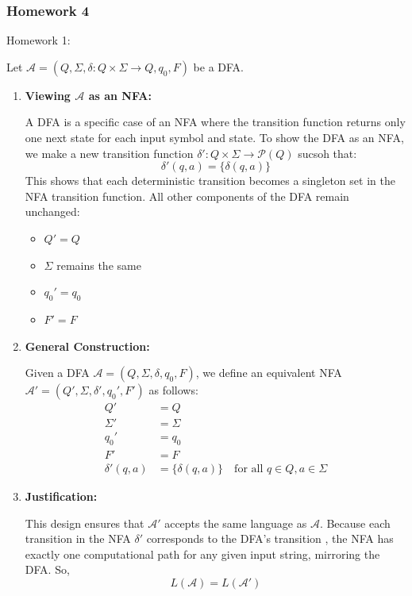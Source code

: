 \documentclass{article}
\theoremstyle{theorem}
\theoremstyle{definition}
\theoremstyle{remark}
\begin{document}
\subsubsection*{Homework 4}

Homework 1:

Let $\mathcal{A} = (Q, \Sigma, \delta: Q \times \Sigma \to Q, q_0, F)$ be a DFA.

\begin{enumerate}
    \item \textbf{Viewing $\mathcal{A}$ as an NFA:}

    A DFA is a specific case of an NFA where the transition function returns only one next state for each input symbol and state. To show the DFA as an NFA, we make a new transition function $\delta': Q \times \Sigma \to \mathcal{P}(Q)$ sucsoh that:
    \[
    \delta'(q, a) = \{ \delta(q, a) \}
    \]
    This shows that each deterministic transition becomes a singleton set in the NFA transition function. All other components of the DFA remain unchanged:
    \begin{itemize}
        \item $Q' = Q$
        \item $\Sigma$ remains the same
        \item $q_0' = q_0$
        \item $F' = F$
    \end{itemize}

    \item \textbf{General Construction:}

    Given a DFA $\mathcal{A} = (Q, \Sigma, \delta, q_0, F)$, we define an equivalent NFA $\mathcal{A}' = (Q', \Sigma, \delta', q_0', F')$ as follows:
    \begin{align*}
        Q' &= Q \\
        \Sigma' &= \Sigma \\
        q_0' &= q_0 \\
        F' &= F \\
        \delta'(q, a) &= \{ \delta(q, a) \} \quad \text{for all } q \in Q, a \in \Sigma
    \end{align*}

    \item \textbf{Justification:}

    This design ensures that $\mathcal{A}'$ accepts the same language as $\mathcal{A}$. Because each transition in the NFA $\delta'$ corresponds to the DFA's transition , the NFA has exactly one computational path for any given input string, mirroring the DFA. So,
    \[
    L(\mathcal{A}) = L(\mathcal{A}')
    \]
\end{enumerate}
\end{document}
